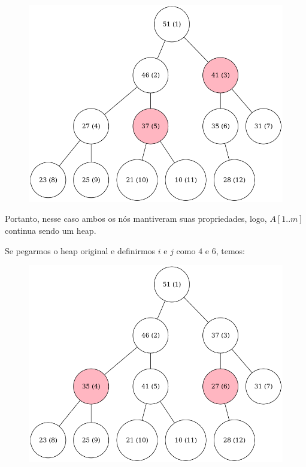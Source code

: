 \documentclass[12pt,a4paper]{article}
\begin{document}
    \begin{figure}[H]
        \centering

        \includegraphics[scale=0.4]{heap2.png}
    \end{figure}

    Portanto, nesse caso ambos os nós mantiveram suas propriedades, logo,
    $A[1..m]$ continua sendo um heap.

    Se pegarmos o heap original e definirmos $i$ e $j$ como  $4$ e $6$, temos:

    \begin{figure}[H]
        \centering

        \includegraphics[scale=0.4]{heap3.png}
    \end{figure}
\end{document}
